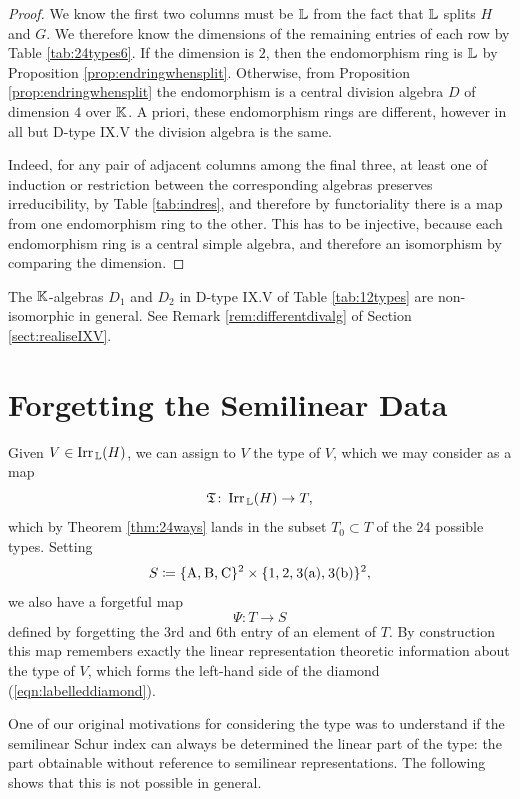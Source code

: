 \begin{proof}
We know the first two columns must be ${\mathbb L}$ from the fact that ${\mathbb L}$ splits $H$ and $G$. We therefore know the dimensions of the remaining entries of each row by Table \ref{tab:24types6}. If the dimension is $2$, then the endomorphism ring is ${\mathbb L}$ by Proposition \ref{prop:endringwhensplit}. Otherwise, from Proposition \ref{prop:endringwhensplit} the endomorphism is a central division algebra $D$ of dimension $4$ over ${\mathbb K}$. A priori, these endomorphism rings are different, however in all but D-type IX.V the division algebra is the same.

Indeed, for any pair of adjacent columns among the final three, at least one of induction or restriction between the corresponding algebras preserves irreducibility, by Table \ref{tab:indres}, and therefore by functoriality there is a map from one endomorphism ring to the other. This has to be injective, because each endomorphism ring is a central simple algebra, and therefore an isomorphism by comparing the dimension.
\end{proof}

\begin{remark}
    The ${\mathbb K}$-algebras $D_1$ and $D_2$ in D-type IX.V of Table \ref{tab:12types} are non-isomorphic in general. See Remark \ref{rem:differentdivalg} of Section \ref{sect:realiseIXV}.
\end{remark}

\section{Forgetting the Semilinear Data}\label{sect:forgetsemilineardata}

Given $V \in \operatorname{Irr}_{\, {\mathbb L}}(H)$, we can assign to $V$ the type of $V$, which we may consider as a map
\[
    {\mathfrak T} \colon  \operatorname{Irr}_{\, {\mathbb L}}(H) \rightarrow T,
\]
which by Theorem \ref{thm:24ways} lands in the subset $T_0 \subset T$ of the 24 possible types. Setting
\[
S \coloneqq \{\text{A,\:B,\:C}\}^2 \times \{\text{1,\:2,\:3(a),\:3(b)}\}^2,
\]
we also have a forgetful map
\[
\Psi \colon T \rightarrow S
\]
defined by forgetting the 3rd and 6th entry of an element of $T$. By construction this map remembers exactly the linear representation theoretic information about the type of $V$, which forms the left-hand side of the diamond (\ref{eqn:labelleddiamond}).

One of our original motivations for considering the type was to understand if the semilinear Schur index can always be determined the linear part of the type: the part obtainable without reference to semilinear representations. The following shows that this is not possible in general.


